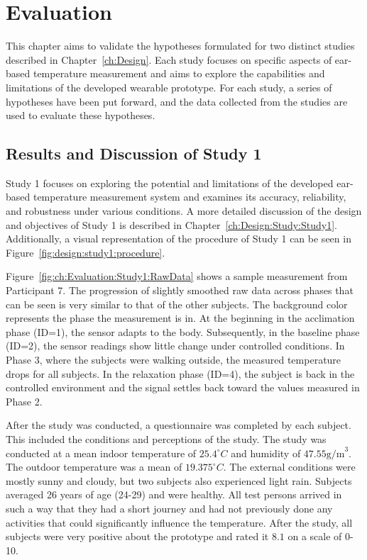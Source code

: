 \chapter{Evaluation}
\label{ch:Evaluation}
This chapter aims to validate the hypotheses formulated for two distinct studies described in Chapter~\ref{ch:Design}. 
Each study focuses on specific aspects of ear-based temperature measurement and aims to explore the capabilities and limitations of the developed wearable prototype. 
For each study, a series of hypotheses have been put forward, and the data collected from the studies are used to evaluate these hypotheses.

\section{Results and Discussion of Study 1}
\label{sec:Evaluation:Study1}
Study 1 focuses on exploring the potential and limitations of the developed ear-based temperature measurement system and examines its accuracy, reliability, and robustness under various conditions. 
A more detailed discussion of the design and objectives of Study 1 is described in Chapter~\ref{ch:Design:Study:Study1}.
Additionally, a visual representation of the procedure of Study 1 can be seen in Figure~\ref{fig:design:study1:procedure}.

Figure~\ref{fig:ch:Evaluation:Study1:RawData} shows a sample measurement from Participant 7.
The progression of slightly smoothed raw data across phases that can be seen is very similar to that of the other subjects. 
The background color represents the phase the measurement is in.
At the beginning in the acclimation phase (ID=1), the sensor adapts to the body. 
Subsequently, in the baseline phase (ID=2), the sensor readings show little change under controlled conditions.
In Phase 3, where the subjects were walking outside, the measured temperature drops for all subjects.
In the relaxation phase (ID=4), the subject is back in the controlled environment and the signal settles back toward the values measured in Phase 2.

After the study was conducted, a questionnaire was completed by each subject. 
This included the conditions and perceptions of the study. 
The study was conducted at a mean indoor temperature of $25.4 ^\circ C$ and humidity of $47.55 \text{g/m}^3$. 
The outdoor temperature was a mean of $19.375 ^\circ C$.
The external conditions were mostly sunny and cloudy, but two subjects also experienced light rain.
Subjects averaged 26 years of age (24-29) and were healthy.
All test persons arrived in such a way that they had a short journey and had not previously done any activities that could significantly influence the temperature.
After the study, all subjects were very positive about the prototype and rated it $8.1$ on a scale of 0-10.

